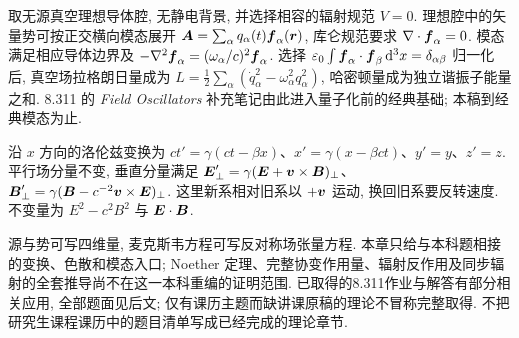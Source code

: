 取无源真空理想导体腔, 无静电背景, 并选择相容的辐射规范 $V=0$. 理想腔中的矢量势可按正交横向模态展开 $\boldsymbol{A}=\sum_\alpha q_\alpha(t)\boldsymbol{f}_\alpha(\boldsymbol{r})$, 库仑规范要求 $\nabla\cdot\boldsymbol{f}_\alpha=0$. 模态满足相应导体边界及 $-\nabla^2\boldsymbol{f}_\alpha=(\omega_\alpha/c)^2\boldsymbol{f}_\alpha$. 选择 $\varepsilon_0\int\boldsymbol{f}_\alpha\cdot\boldsymbol{f}_\beta\,\mathrm d^3x=\delta_{\alpha\beta}$ 归一化后, 真空场拉格朗日量成为 $L=\frac12\sum_\alpha(\dot q_\alpha^2-\omega_\alpha^2q_\alpha^2)$, 哈密顿量成为独立谐振子能量之和. 8.311 的 \textit{Field Oscillators} 补充笔记由此进入量子化前的经典基础; 本稿到经典模态为止.

沿 $x$ 方向的洛伦兹变换为 $ct'=\gamma(ct-\beta x)$、$x'=\gamma(x-\beta ct)$、$y'=y$、$z'=z$. 平行场分量不变, 垂直分量满足 $\boldsymbol{E}'_\perp=\gamma(\boldsymbol{E}+\boldsymbol{v}\times\boldsymbol{B})_\perp$、$\boldsymbol{B}'_\perp=\gamma(\boldsymbol{B}-c^{-2}\boldsymbol{v}\times\boldsymbol{E})_\perp$. 这里新系相对旧系以 $+\boldsymbol{v}$ 运动, 换回旧系要反转速度. 不变量为 $E^2-c^2B^2$ 与 $\boldsymbol{E}\cdot\boldsymbol{B}$.

源与势可写四维量, 麦克斯韦方程可写反对称场张量方程. 本章只给与本科题相接的变换、色散和模态入口; Noether 定理、完整协变作用量、辐射反作用及同步辐射的全套推导尚不在这一本科重编的证明范围. 已取得的8.311作业与解答有部分相关应用, 全部题面见后文; 仅有课历主题而缺讲课原稿的理论不冒称完整取得. 不把研究生课程课历中的题目清单写成已经完成的理论章节.


